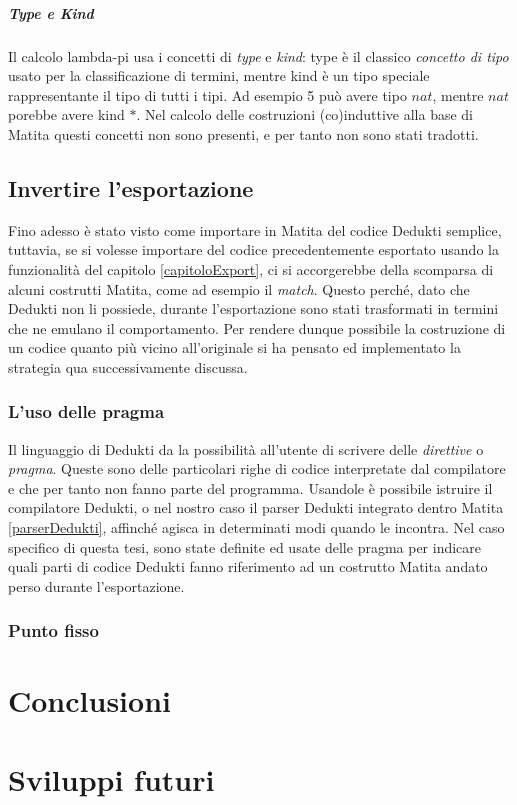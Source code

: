 \documentclass[12pt,a4paper]{report}
\begin{document}
\paragraph{Type e Kind}
Il calcolo lambda-pi usa i concetti di \textit{type} e \textit{kind}: type è
il classico \textit{concetto di tipo} usato per la classificazione di termini,
mentre kind è un tipo speciale rappresentante il tipo di tutti i tipi. Ad 
esempio 5 può avere tipo $nat$, mentre $nat$ porebbe avere kind $*$. Nel 
calcolo delle costruzioni (co)induttive alla base di Matita questi concetti
non sono presenti, e per tanto non sono stati tradotti. %

\section{Invertire l'esportazione}
Fino adesso è stato visto come importare in Matita del codice Dedukti semplice,
tuttavia, se si volesse importare del codice precedentemente esportato usando
la funzionalità del capitolo \ref{capitoloExport}, ci si accorgerebbe della 
scomparsa di alcuni costrutti Matita, come ad esempio il \textit{match}. Questo
perché, dato che Dedukti non li possiede, durante l'esportazione sono stati
trasformati in termini che ne emulano il comportamento. Per rendere dunque possibile
la costruzione di un codice quanto più vicino all'originale si ha pensato ed 
implementato la strategia qua successivamente discussa.

\subsection{L'uso delle pragma}
Il linguaggio di Dedukti da la possibilità all'utente di scrivere delle 
\textit{direttive} o \textit{pragma}. Queste sono delle particolari righe di
codice interpretate dal compilatore e che per tanto non fanno parte del programma.
Usandole è possibile istruire il compilatore Dedukti, o nel nostro caso il parser
Dedukti integrato dentro Matita \ref{parserDedukti}, affinché agisca in determinati
modi quando le incontra. 
Nel caso specifico di questa tesi, sono state definite ed usate delle pragma
per indicare quali parti di codice Dedukti fanno riferimento ad un costrutto 
Matita andato perso durante l'esportazione.

\subsection{Punto fisso}


\chapter{Conclusioni}

\chapter{Sviluppi futuri}



\end{document}
